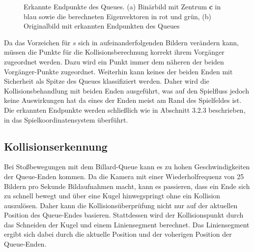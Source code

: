 \begin{figure}[H]
	\label{fig:pca}
	\centering
	\caption{Erkannte Endpunkte des Queues. (a) Binärbild mit Zentrum \textbf{c} in blau sowie die berechneten Eigenvektoren in rot und grün, (b) Originalbild mit erkannten Endpunkten des Queues}
\end{figure}

Da das Vorzeichen für $s$ sich in aufeinanderfolgenden Bildern verändern kann, müssen die Punkte für die Kollisionsberechnung korrekt ihrem Vorgänger zugeordnet werden.
Dazu wird ein Punkt immer dem näheren der beiden Vorgänger-Punkte zugeordnet.
Weiterhin kann keines der beiden Enden mit Sicherheit als Spitze des Queues klassifiziert werden.
Daher wird die Kollisionsbehandlung mit beiden Enden ausgeführt, was auf den Spielfluss jedoch keine Auswirkungen hat da eines der Enden meist am Rand des Spielfeldes ist.
Die erkannten Endpunkte werden schließlich wie in Abschnitt 3.2.3 beschrieben, in das Spielkoordinatensystem überführt.

\subsection{Kollisionserkennung}

Bei Stoßbewegungen mit dem Billard-Queue kann es zu hohen Geschwindigkeiten der Queue-Enden kommen. 
Da die Kamera mit einer Wiederholfrequenz von 25 Bildern pro Sekunde Bildaufnahmen macht, kann es passieren, dass ein Ende sich zu schnell bewegt und über eine Kugel hinwegspringt ohne ein Kollision auszulösen. 
Daher kann die Kollisionsüberprüfung nicht nur auf der aktuellen Position des Queue-Endes basieren.
Stattdessen wird der Kollisionspunkt durch das Schneiden der Kugel und einem  Liniensegment berechnet. 
Das Liniensegment ergibt sich dabei durch die aktuelle Position und der voherigen Position der Queue-Enden.

